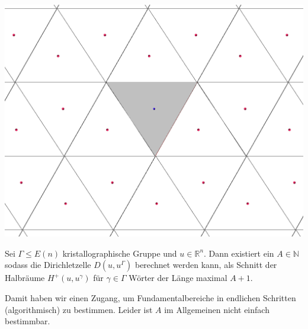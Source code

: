 \documentclass{beamer}
\theoremstyle{plain}
\newcommand\R{\mathbb R}
\newcommand\N{\mathbb N}
\begin{document}

\begin{frame}
    \centering
    \includegraphics[width=\textwidth]{images/p2-hex-dirichlet.png}
\end{frame}

\begin{frame}
    \begin{theorem}
        Sei $\Gamma \leq E(n)$ kristallographische Gruppe und $u \in \R^n$. Dann existiert ein $A \in \N$ sodass die Dirichletzelle $D(u, u^\Gamma)$ berechnet werden kann, als Schnitt der Halbräume $H^+(u, u^\gamma)$ für $\gamma \in \Gamma$ Wörter der Länge maximal $A+1$.  
    \end{theorem} \pause
    Damit haben wir einen Zugang, um Fundamentalbereiche in endlichen Schritten (algorithmisch) zu bestimmen. Leider ist $A$ im Allgemeinen nicht einfach bestimmbar.
\end{frame}
\end{document}
